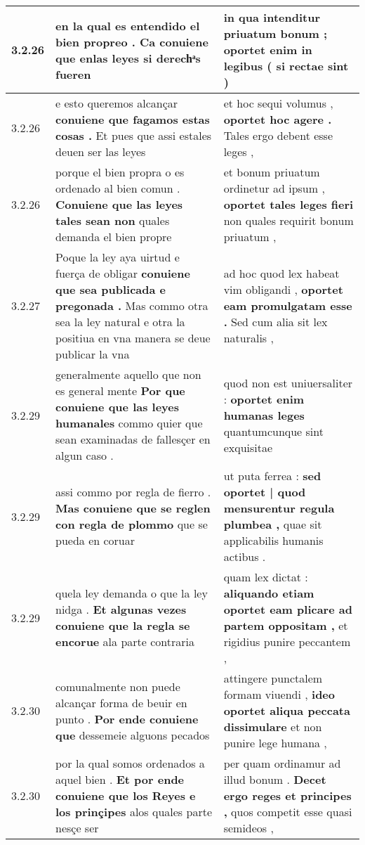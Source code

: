 \begin{tabular}{|p{1cm}|p{6.5cm}|p{6.5cm}|}
3.2.26 & en la qual es entendido el bien propreo . \textbf{ Ca conuiene que enlas leyes } si derechͣs fueren & in qua intenditur priuatum bonum ; \textbf{ oportet enim in legibus } ( si rectae sint ) \\\hline
3.2.26 & e esto queremos alcançar \textbf{ conuiene que fagamos estas cosas . } Et pues que assi estales deuen ser las leyes & et hoc sequi volumus , \textbf{ oportet hoc agere . } Tales ergo debent esse leges , \\\hline
3.2.26 & porque el bien propra o es ordenado al bien comun . \textbf{ Conuiene que las leyes tales sean non } quales demanda el bien propre & et bonum priuatum ordinetur ad ipsum , \textbf{ oportet tales leges fieri } non quales requirit bonum priuatum , \\\hline
3.2.27 & Poque la ley aya uirtud e fuerça de obligar \textbf{ conuiene que sea publicada e pregonada . } Mas commo otra sea la ley natural e otra la positiua en vna manera se deue publicar la vna & ad hoc quod lex habeat vim obligandi , \textbf{ oportet eam promulgatam esse . } Sed cum alia sit lex naturalis , \\\hline
3.2.29 & generalmente aquello que non es general mente \textbf{ Por que conuiene que las leyes humanales } commo quier que sean examinadas de fallesçer en algun caso . & quod non est uniuersaliter : \textbf{ oportet enim humanas leges } quantumcunque sint exquisitae \\\hline
3.2.29 & assi commo por regla de fierro . \textbf{ Mas conuiene que se reglen con regla de plommo } que se pueda en coruar & ut puta ferrea : \textbf{ sed oportet | quod mensurentur regula plumbea , } quae sit applicabilis humanis actibus . \\\hline
3.2.29 & quela ley demanda o que la ley nidga . \textbf{ Et algunas vezes conuiene que la regla se encorue } ala parte contraria & quam lex dictat : \textbf{ aliquando etiam oportet eam plicare ad partem oppositam , } et rigidius punire peccantem , \\\hline
3.2.30 & comunalmente non puede alcançar forma de beuir en punto . \textbf{ Por ende conuiene que } dessemeie alguons pecados & attingere punctalem formam viuendi , \textbf{ ideo oportet aliqua peccata dissimulare } et non punire lege humana , \\\hline
3.2.30 & por la qual somos ordenados a aquel bien . \textbf{ Et por ende conuiene que los Reyes e los prinçipes } alos quales parte nesçe ser & per quam ordinamur ad illud bonum . \textbf{ Decet ergo reges et principes , } quos competit esse quasi semideos , \\\hline

\end{tabular}
